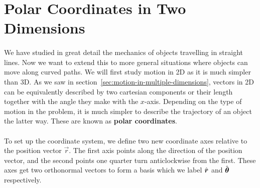 \documentclass[../classical_mechanics.tex]{subfiles}
\begin{document}
    \section{Polar Coordinates in Two Dimensions}\label{sec:polar-coordinates-in-two-dimensions}
        \paragraph{}
        We have studied in great detail the mechanics of objects travelling in straight lines.
        Now we want to extend this to more general situations where objects can move along curved paths.
        We will first study motion in 2D as it is much simpler than 3D.
        As we saw in section~\ref{sec:motion-in-multiple-dimensions}, vectors in 2D can be equivalently described by two cartesian components or their length together with the angle they make with the $x$-axis.
        Depending on the type of motion in the problem, it is much simpler to describe the trajectory of an object the latter way.
        These are known as \textbf{polar coordinates}.

        \paragraph{}
        To set up the coordinate system, we define two new coordinate axes relative to the position vector $\vec{r}$.
        The first axis points along the direction of the position vector, and the second points one quarter turn anticlockwise from the first.
        These axes get two orthonormal vectors to form a basis which we label $\hat{\boldsymbol{r}}$ and $\hat{\boldsymbol{\theta}}$ respectively.
        \begin{figure}[H]
            \centering
        \end{figure}
\end{document}
